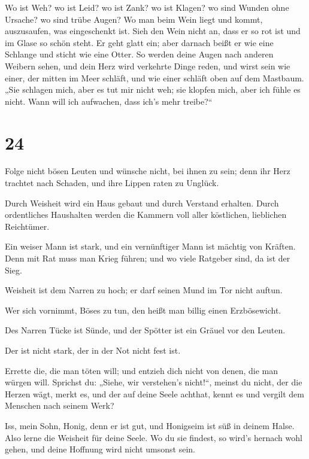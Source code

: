  Wo ist Weh? wo ist Leid? wo ist Zank? wo ist Klagen? wo
sind Wunden ohne Ursache? wo sind trübe Augen?  Wo man
beim Wein liegt und kommt, auszusaufen, was eingeschenkt ist.
 Sieh den Wein nicht an, dass er so rot ist und im Glase
so schön steht. Er geht glatt ein;  aber darnach beißt er
wie eine Schlange und sticht wie eine Otter.  So werden
deine Augen nach anderen Weibern sehen, und dein Herz wird verkehrte
Dinge reden,  und wirst sein wie einer, der mitten im
Meer schläft, und wie einer schläft oben auf dem Mastbaum.
 „Sie schlagen mich, aber es tut mir nicht weh; sie
klopfen mich, aber ich fühle es nicht. Wann will ich aufwachen, dass
ich's mehr treibe?{}``

\hypertarget{section-23}{%
\section{24}\label{section-23}}

 Folge nicht bösen Leuten und wünsche nicht, bei ihnen zu
sein;  denn ihr Herz trachtet nach Schaden, und ihre
Lippen raten zu Unglück.

 Durch Weisheit wird ein Haus gebaut und durch Verstand
erhalten.  Durch ordentliches Haushalten werden die
Kammern voll aller köstlichen, lieblichen Reichtümer.

 Ein weiser Mann ist stark, und ein vernünftiger Mann ist
mächtig von Kräften.  Denn mit Rat muss man Krieg führen;
und wo viele Ratgeber sind, da ist der Sieg.

 Weisheit ist dem Narren zu hoch; er darf seinen Mund im
Tor nicht auftun.

 Wer sich vornimmt, Böses zu tun, den heißt man billig
einen Erzbösewicht.

 Des Narren Tücke ist Sünde, und der Spötter ist ein
Gräuel vor den Leuten.

 Der ist nicht stark, der in der Not nicht fest ist.

 Errette die, die man töten will; und entzieh dich nicht
von denen, die man würgen will.  Sprichst du: „Siehe, wir
verstehen's nicht!{}``, meinst du nicht, der die Herzen wägt, merkt es,
und der auf deine Seele achthat, kennt es und vergilt dem Menschen nach
seinem Werk?

 Iss, mein Sohn, Honig, denn er ist gut, und Honigseim
ist süß in deinem Halse.  Also lerne die Weisheit für
deine Seele. Wo du sie findest, so wird's hernach wohl gehen, und deine
Hoffnung wird nicht umsonst sein.

